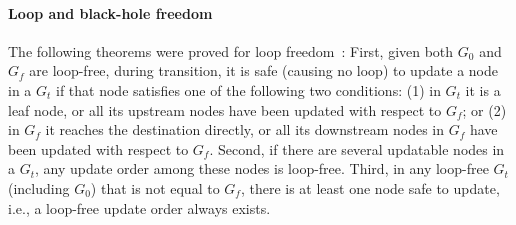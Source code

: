 \paragraph{Loop and black-hole freedom}

The following theorems were proved for loop freedom~\cite{loopfree}:
First, given both $G_0$ and $G_f$ are loop-free,
during transition, it is safe (causing no loop) to update a node in a $G_t$ if that node satisfies 
one of the following two conditions: (1) in $G_t$ it is a leaf node, or all its upstream nodes
have been updated with respect to $G_f$; or (2) in $G_f$ it reaches the destination directly,
or all its downstream nodes in $G_f$ have been updated with respect to $G_f$.
Second, if there are several updatable nodes in a $G_t$, any update order among these nodes is
loop-free. Third, in any loop-free $G_t$ (including $G_0$) that is not equal to $G_f$,
there is at least one node safe to update, i.e., a loop-free update order always exists.


%
%

